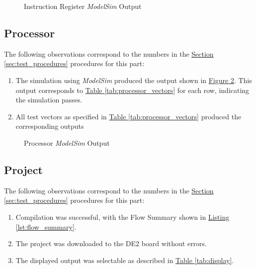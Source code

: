 \begin{figure}[htbp]
    \caption{Instruction Register \emph{ModelSim} Output\label{fig:ir_output}}
\end{figure}


\subsection{Processor} %
\label{sub:processor}

The following observations correspond to the numbers in the \hyperref[sec:test_procedures]{Section \ref*{sec:test_procedures}} procedures for this part:

\begin{enumerate}
    \item The simulation using \emph{ModelSim} produced the output shown in \hyperref[fig:processor_output]{Figure \ref*{fig:processor_output}}.
    This output corresponds to \hyperref[tab:processor_vectors]{Table \ref*{tab:processor_vectors}} for each row, indicating the simulation passes.
    \item All test vectors as specified in \hyperref[tab:processor_vectors]{Table \ref*{tab:processor_vectors}} produced the corresponding outputs
\end{enumerate}

\begin{figure}[htbp]
    \caption{Processor \emph{ModelSim} Output\label{fig:processor_output}}
\end{figure}


\subsection{Project} %
\label{sub:projects}

The following observations correspond to the numbers in the \hyperref[sec:test_procedures]{Section \ref*{sec:test_procedures}} procedures for this part:

\begin{enumerate}
    \item Compilation was successful, with the Flow Summary shown in \hyperref[lst:flow_summary]{Listing \ref*{lst:flow_summary}}.
    \item The project was downloaded to the DE2 board without errors.
    \item The displayed output was selectable as described in \hyperref[tab:display]{Table \ref*{tab:display}}.
\end{enumerate}




